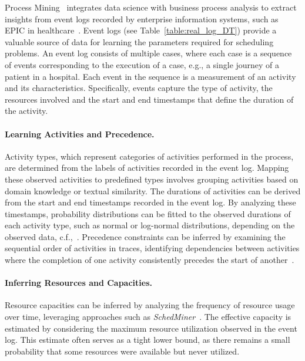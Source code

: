 Process Mining~\cite{van2016data} integrates data science with business process analysis to extract insights from event logs recorded by enterprise information systems, such as EPIC in healthcare~\cite{johnson2016comprehensive}. Event logs (see Table~\ref{table:real_log_DT}) provide a valuable source of data for learning the parameters required for scheduling problems. 
An event log consists of multiple cases, where each case 
is a sequence of events 
corresponding to the execution of a case, e.g., a single journey of a patient in a hospital. Each event 
in the sequence is a measurement of an activity and its characteristics. 
Specifically, events capture the type of activity, the resources involved and the start and end timestamps that define the duration of the activity.


\paragraph{Learning Activities and Precedence.} Activity types, which represent categories of activities performed in the process, are determined from the labels of activities recorded in the event log. Mapping these observed activities to predefined types involves grouping activities based on domain knowledge or textual similarity. The durations of activities can be derived from the start and end timestamps recorded in the event log. By analyzing these timestamps, probability distributions can be fitted to the observed durations of each activity type, such as normal or log-normal distributions, depending on the observed data, c.f.,~\cite{simod}. Precedence constraints can be inferred by examining the sequential order of activities in traces, identifying dependencies between activities where the completion of one activity consistently precedes the start of another~\cite{senderovich2019learning}. 

\paragraph{Inferring Resources and Capacities.} Resource capacities can be inferred by analyzing the frequency of resource usage over time, leveraging approaches such as \textit{SchedMiner}~\cite{SenderovichRGMM15}. 
The effective capacity is estimated by considering the maximum resource utilization observed in the event log. This estimate often serves as a tight lower bound, as there remains a small probability that some resources were available but never utilized.

